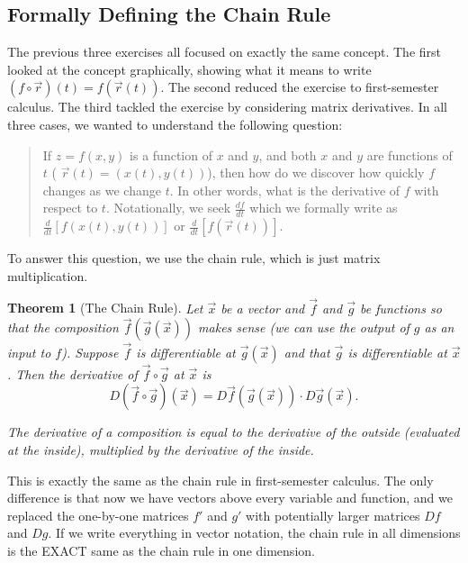 \documentclass[10pt,]{book}
\theoremstyle{plain}
\newtheorem{theorem}{Theorem}[section]
\theoremstyle{definition}
\theoremstyle{definition}
\theoremstyle{definition}
\theoremstyle{definition}
\theoremstyle{definition}
\numberwithin{equation}{section}
\newcommand{\ds}{\displaystyle}
\begin{document}
\subsection[{Formally Defining the Chain Rule}]{Formally Defining the Chain Rule}\label{subsection-37}
The previous three exercises all focused on exactly the same concept. The first looked at the concept graphically, showing what it means to write \((f\circ \vec r)(t)=f(\vec r(t))\). The second reduced the exercise to first-semester calculus. The third tackled the exercise by considering matrix derivatives. In all three cases, we wanted to understand the following question:%
\begin{quote}\hypertarget{blockquote-2}{}
If \(z=f(x,y)\) is a function of \(x\) and \(y\), and both \(x\) and \(y\) are functions of \(t\) ( \(\vec r(t)=(x(t),y(t))\)), then how do we discover how quickly \(f\) changes as we change \(t\). In other words, what is the derivative of \(f\) with respect to \(t\). Notationally, we seek \(\ds \frac{df}{dt}\) which we formally write as \(\ds \frac{d}{dt}[f(x(t),y(t))]\) or \(\ds \frac{d}{dt} [f(\vec r(t))].\)%
\end{quote}
To answer this question, we use the chain rule, which is just matrix multiplication.%
\begin{theorem}[{The Chain Rule}]\label{def_chain_rule}
Let \(\vec x\) be a vector and \(\vec f\) and \(\vec g\) be functions so that the composition \(\vec f(\vec g(\vec x))\) makes sense (we can use the output of \(g\) as an input to \(f\)). Suppose \(\vec f\) is differentiable at \(\vec g(\vec x)\) and that \(\vec g\) is differentiable at \(\vec x\). Then the derivative of \(\vec f\circ \vec g\) at \(\vec x\) is%
\begin{equation*}
D(\vec f\circ \vec g)(\vec x) = D\vec f(\vec g(\vec x))\cdot D\vec g(\vec x).
\end{equation*}
%
\par
The derivative of a composition is equal to the derivative of the outside (evaluated at the inside), multiplied by the derivative of the inside.%
\end{theorem}
This is exactly the same as the chain rule in first-semester calculus. The only difference is that now we have vectors above every variable and function, and we replaced the one-by-one matrices \(f'\) and \(g'\) with potentially larger matrices \(Df\) and \(Dg\). If we write everything in vector notation, the chain rule in all dimensions is the EXACT same as the chain rule in one dimension.%
\typeout{************************************************}
\typeout{************************************************}
\end{document}

